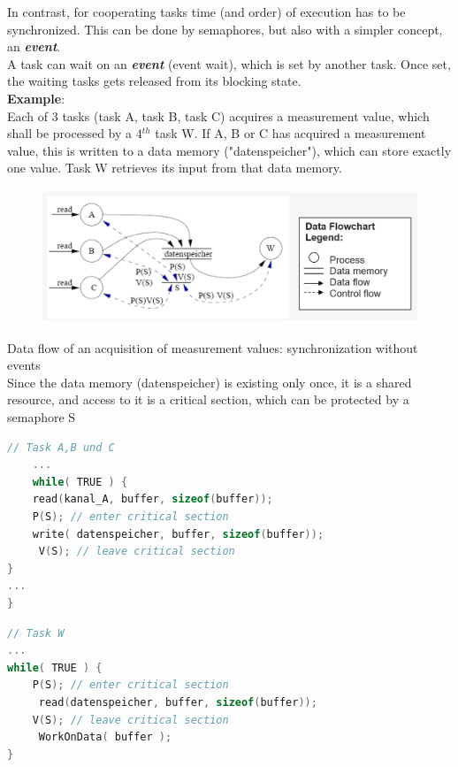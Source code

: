 In contrast, for cooperating tasks time (and order) of execution has to be synchronized. This can be done by semaphores, but also with a simpler concept, an \textbf{\textit{event}}.\\

A task can wait on an \textbf{\textit{event}} (event wait), which is set by another task. Once set, the waiting tasks gets released from its blocking state.\\

\textbf{Example}: \\
Each of 3 tasks (task A, task B, task C) acquires a measurement value, which shall be processed by a 4${}^{th}$ task W. If A, B or C has acquired a measurement value, this is written to a data memory ("datenspeicher"), which can store exactly one value. Task W retrieves its input from that data memory.

 	\begin{figure}[h]
    \centering
    \includegraphics[width=14cm, height=4cm]{Images/image111.png}
    \label{fig:Fig }
    \end{figure}

Data flow of an acquisition of measurement values: synchronization without events\\

Since the data memory (datenspeicher) is existing only once, it is a shared resource, and access to it is a critical section, which can be protected by a semaphore S\\

\begin{lstlisting}[style=mystyle, language=c]
// Task A,B und C
	...
	while( TRUE ) {
  	read(kanal_A, buffer, sizeof(buffer));
  	P(S); // enter critical section
  	write( datenspeicher, buffer, sizeof(buffer));
 	 V(S); // leave critical section
}
...
}
\end{lstlisting}

\begin{lstlisting}[style=mystyle, language=c]
// Task W
...
while( TRUE ) {
  	P(S); // enter critical section
 	 read(datenspeicher, buffer, sizeof(buffer));
  	V(S); // leave critical section
 	 WorkOnData( buffer );
}
\end{lstlisting}

